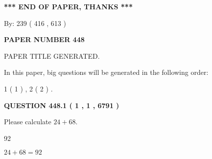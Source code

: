 \documentclass[12pt]{article}
\begin{document}
   
   
   
\vspace{1.0in} 
{\textbf{\large{ *** END OF PAPER, THANKS *** }}} 
   
   
\hspace{1.0in} By: 
 239 ( 416 ,  613 )
   
   
   
   
\newpage 
\setcounter{page}{ 
   448001 } 
   
   
   
   
 {\textbf{ \Large{ PAPER NUMBER  448  }}}
   
   
\vspace{0.2in}
   
   
   
   
   
   
   
   
 \vspace{0.2in}
 
 
 
 
   
   
 PAPER TITLE GENERATED.
   
   
   
\vspace{0.2in}
   
In this paper, big questions will be generated in the following order: 
   
   
   1 ( 1 )
 ,
   2 ( 2 )
 .
  
\vspace{0.2in}
  
{\textbf{\Large{QUESTION
448.1 
 ( 1 , 1 , 6791 )
}}}
  
  
 
Please calculate $ %
24 +  %
68 $.
 
 
 
\noindent{}
 
 

92
 
 
\noindent{}
 
 

 
 
 
\noindent{}
 
 

$ %
24 +  %
68=   %
92$
 
\end{document}
